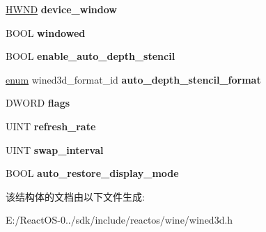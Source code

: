 \begin{DoxyCompactItemize}
\hyperlink{interfacevoid}{H\+W\+ND} {\bfseries device\+\_\+window}
\item 
\mbox{\label{structwined3d__swapchain__desc_ad07259b1566604a9dd13c3341df04425}} 
B\+O\+OL {\bfseries windowed}
\item 
\mbox{\label{structwined3d__swapchain__desc_aac38b9bfb32bfa1f93a64db50121eae8}} 
B\+O\+OL {\bfseries enable\+\_\+auto\+\_\+depth\+\_\+stencil}
\item 
\mbox{\label{structwined3d__swapchain__desc_a70b5d5e94895fcfb9669fc5794fcf6f6}} 
\hyperlink{interfaceenum}{enum} wined3d\+\_\+format\+\_\+id {\bfseries auto\+\_\+depth\+\_\+stencil\+\_\+format}
\item 
\mbox{\label{structwined3d__swapchain__desc_a488c4f3cdf9f6074c61c9193408cb645}} 
D\+W\+O\+RD {\bfseries flags}
\item 
\mbox{\label{structwined3d__swapchain__desc_a4e5f817faa922399dae746414d2f5484}} 
U\+I\+NT {\bfseries refresh\+\_\+rate}
\item 
\mbox{\label{structwined3d__swapchain__desc_a67338670b2b9de5c921cf4c01fb528d0}} 
U\+I\+NT {\bfseries swap\+\_\+interval}
\item 
\mbox{\label{structwined3d__swapchain__desc_a4f62c60e5fc4c0f287cb8e518eaeedfc}} 
B\+O\+OL {\bfseries auto\+\_\+restore\+\_\+display\+\_\+mode}
\end{DoxyCompactItemize}


该结构体的文档由以下文件生成\+:\begin{DoxyCompactItemize}
\item 
E\+:/\+React\+O\+S-\/0../sdk/include/reactos/wine/wined3d.\+h\end{DoxyCompactItemize}
